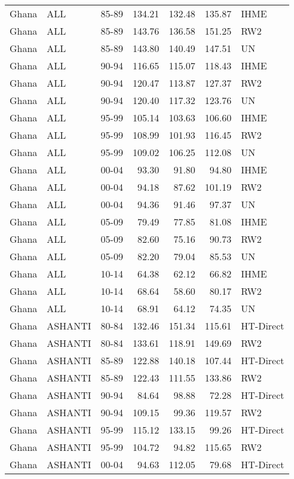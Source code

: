 \begin{longtable}{lllrrrl}
  Ghana & ALL & 85-89 & 134.21 & 132.48 & 135.87 & IHME \\ 
  Ghana & ALL & 85-89 & 143.76 & 136.58 & 151.25 & RW2 \\ 
  Ghana & ALL & 85-89 & 143.80 & 140.49 & 147.51 & UN \\ 
  Ghana & ALL & 90-94 & 116.65 & 115.07 & 118.43 & IHME \\ 
  Ghana & ALL & 90-94 & 120.47 & 113.87 & 127.37 & RW2 \\ 
  Ghana & ALL & 90-94 & 120.40 & 117.32 & 123.76 & UN \\ 
  Ghana & ALL & 95-99 & 105.14 & 103.63 & 106.60 & IHME \\ 
  Ghana & ALL & 95-99 & 108.99 & 101.93 & 116.45 & RW2 \\ 
  Ghana & ALL & 95-99 & 109.02 & 106.25 & 112.08 & UN \\ 
  Ghana & ALL & 00-04 & 93.30 & 91.80 & 94.80 & IHME \\ 
  Ghana & ALL & 00-04 & 94.18 & 87.62 & 101.19 & RW2 \\ 
  Ghana & ALL & 00-04 & 94.36 & 91.46 & 97.37 & UN \\ 
  Ghana & ALL & 05-09 & 79.49 & 77.85 & 81.08 & IHME \\ 
  Ghana & ALL & 05-09 & 82.60 & 75.16 & 90.73 & RW2 \\ 
  Ghana & ALL & 05-09 & 82.20 & 79.04 & 85.53 & UN \\ 
  Ghana & ALL & 10-14 & 64.38 & 62.12 & 66.82 & IHME \\ 
  Ghana & ALL & 10-14 & 68.64 & 58.60 & 80.17 & RW2 \\ 
  Ghana & ALL & 10-14 & 68.91 & 64.12 & 74.35 & UN \\ 
  Ghana & ASHANTI & 80-84 & 132.46 & 151.34 & 115.61 & HT-Direct \\ 
  Ghana & ASHANTI & 80-84 & 133.61 & 118.91 & 149.69 & RW2 \\ 
  Ghana & ASHANTI & 85-89 & 122.88 & 140.18 & 107.44 & HT-Direct \\ 
  Ghana & ASHANTI & 85-89 & 122.43 & 111.55 & 133.86 & RW2 \\ 
  Ghana & ASHANTI & 90-94 & 84.64 & 98.88 & 72.28 & HT-Direct \\ 
  Ghana & ASHANTI & 90-94 & 109.15 & 99.36 & 119.57 & RW2 \\ 
  Ghana & ASHANTI & 95-99 & 115.12 & 133.15 & 99.26 & HT-Direct \\ 
  Ghana & ASHANTI & 95-99 & 104.72 & 94.82 & 115.65 & RW2 \\ 
  Ghana & ASHANTI & 00-04 & 94.63 & 112.05 & 79.68 & HT-Direct \\ 

\end{longtable}
